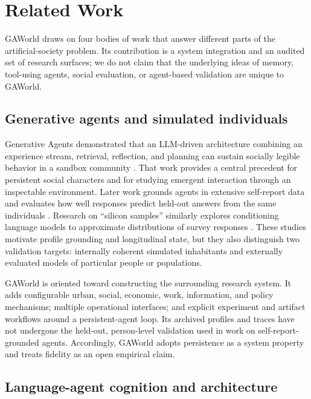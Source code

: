 \section{Related Work}
\label{sec:related-work}

GAWorld draws on four bodies of work that answer different parts of the
artificial-society problem.  Its contribution is a system integration and an
audited set of research surfaces; we do not claim that the underlying ideas of
memory, tool-using agents, social evaluation, or agent-based validation are
unique to GAWorld.

\subsection{Generative agents and simulated individuals}

Generative Agents demonstrated that an LLM-driven architecture combining an
experience stream, retrieval, reflection, and planning can sustain socially
legible behavior in a sandbox community \citep{park2023generative}.  That work
provides a central precedent for persistent social characters and for studying
emergent interaction through an inspectable environment.  Later work grounds
agents in extensive self-report data and evaluates how well responses predict
held-out answers from the same individuals \citep{park2024grounded}.  Research
on ``silicon samples'' similarly explores conditioning language models to
approximate distributions of survey responses
\citep{argyle2023outofone}.  These studies motivate profile grounding and
longitudinal state, but they also distinguish two validation targets:
internally coherent simulated inhabitants and externally evaluated models of
particular people or populations.

GAWorld is oriented toward constructing the surrounding research system.  It
adds configurable urban, social, economic, work, information, and policy
mechanisms; multiple operational interfaces; and explicit experiment and
artifact workflows around a persistent-agent loop.  Its archived profiles and
traces have not undergone the held-out, person-level validation used in work
on self-report-grounded agents.  Accordingly, GAWorld adopts persistence as a
system property and treats fidelity as an open empirical claim.

\subsection{Language-agent cognition and architecture}

